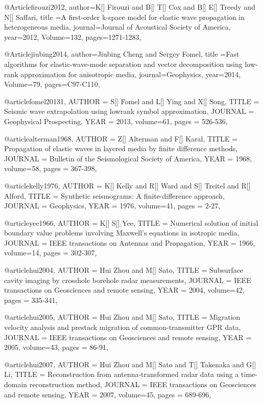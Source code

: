 {@Article{firouzi2012,
  author={K[] Firouzi and B[] T[] Cox and B[] E[] Treedy and N[] Saffari},
  title ={A first-order k-space model for elastic wave propagation in heterogeneous media},
  journal={Journal of Acoustical Society of America},
  year=2012,
  Volume=132,
  pages={1271-1283},
}


@Article{jiubing2014,
  author={Jiubing Cheng and Sergey Fomel},
  title ={Fast algorithms for elastic-wave-mode separation and vector decomposition using low-rank approximation for anisotropic media},
  journal={Geophysics},
  year=2014,
  Volume=79,
  pages={C97-C110},
}

@article{fomel20131,
  AUTHOR =       {S[] Fomel and L[] Ying and X[] Song},
  TITLE =        {Seismic wave extrapolation using lowrank symbol approximation},
  JOURNAL =      {Geophysical Prospecting},
  YEAR =         {2013},
  volume=61,
  pages = {526-536},
}

@article{alterman1968,
  AUTHOR =       {Z[] Alterman and F[] Karal},
  TITLE =        {Propagation of elastic waves in layered media by finite difference methods},
  JOURNAL =      {Bulletin of the Seismological Society of America},
  YEAR =         {1968},
  volume=58,
  pages = {367-398},
}

@article{kelly1976,
  AUTHOR =       {K[] Kelly and R[] Ward and S[] Treitel and R[] Alford},
  TITLE =        {Synthetic seismograms: A finite-difference approach},
  JOURNAL =      {Geophysics},
  YEAR =         {1976},
  volume=41,
  pages = {2-27},
}

@article{yee1966,
  AUTHOR =       {K[] S[] Yee},
  TITLE =        {Numerical solution of initial boundary value problems involving Maxwell's equations in isotropic media},
  JOURNAL =      {IEEE transactions on Antennas and Propagation},
  YEAR =         {1966},
  volume=14,
  pages = {302-307},
}

@article{hui2004,
  AUTHOR =       {Hui Zhou and M[] Sato},
  TITLE =        {Subsurface cavity imaging by crosshole borehole radar measurements},
  JOURNAL =      {IEEE transactions on Geosciences and remote sensing},
  YEAR =         {2004},
  volume=42,
  pages = {335-341},
}

@article{hui2005,
  AUTHOR =       {Hui Zhou and M[] Sato},
  TITLE =        {Migration velocity analysis and prestack migration of common-transmitter GPR data},
  JOURNAL =      {IEEE transactions on Geosciences and remote sensing},
  YEAR =         {2005},
  volume=43,
  pages = {86-91},
}

@article{hui2007,
  AUTHOR =       {Hui Zhou and M[] Sato and T[] Takenaka and G[] Li},
  TITLE =        {Reconstruction from antenna-transformed radar data using a time-domain reconstruction method},
  JOURNAL =      {IEEE transactions on Geosciences and remote sensing},
  YEAR =         {2007},
  volume=45,
  pages = {689-696},
}

}
